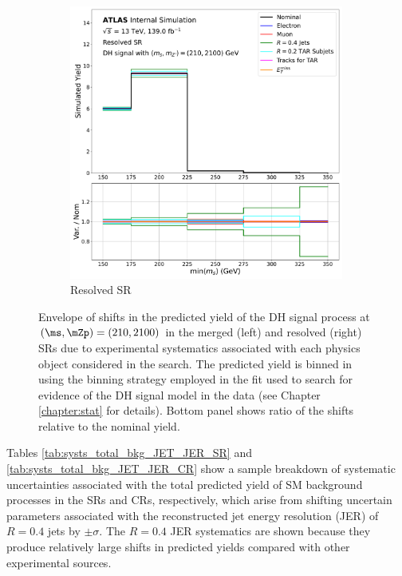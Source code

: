 \begin{figure}[htbp]
\begin{subfigure}[t]{0.48\textwidth}
     \includegraphics[width = 0.99\textwidth]{Figures/6/exp_systs_monoSWWsemilep_zp2100_dm200_dh210_SR_res_TARJets10_minmS_res.pdf}
     \caption{Resolved SR}
    \end{subfigure}
    \caption{Envelope of shifts in the predicted yield of the DH signal process at \((\ms, \mZp)=(210, 2100)\) in the merged (left) and resolved (right) SRs due to experimental systematics associated with each physics object considered in the search. The predicted yield is binned in \minms using the binning strategy employed in the fit used to search for evidence of the DH signal model in the data (see Chapter \ref{chapter:stat} for details). Bottom panel shows ratio of the shifts relative to the nominal yield. }
   \label{fig:exp_syst_shifts_sig}
\end{figure}

Tables \ref{tab:systs_total_bkg_JET_JER_SR} and \ref{tab:systs_total_bkg_JET_JER_CR} show a sample breakdown of systematic uncertainties associated with the total predicted yield of SM background processes in the SRs and CRs, respectively, which arise from shifting uncertain parameters associated with the reconstructed jet energy resolution (JER) of \(R=0.4\) jets by \(\pm\sigma\). The \(R=0.4\) JER systematics are shown because they produce relatively large shifts in predicted yields compared with other experimental sources.

